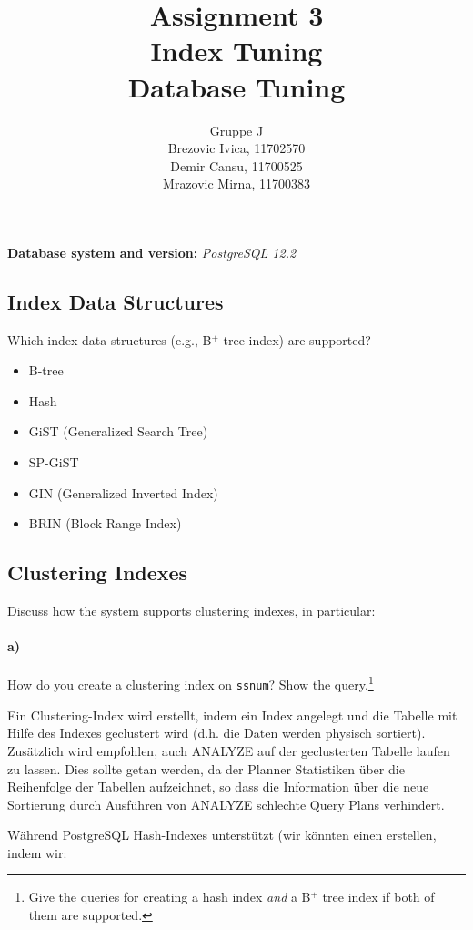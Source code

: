 \documentclass[11pt]{scrartcl}
\title{
  \textbf{\large Assignment 3} \\
  Index Tuning \\
  {\large Database Tuning}}
\author{
  Gruppe J \\
  \large Brezovic Ivica, 11702570 \\
  \large Demir Cansu, 11700525 \\
  \large Mrazovic Mirna, 11700383
}
\begin{document}
\maketitle

\textbf{Database system and version:} \emph{PostgreSQL 12.2}

\subsection{Index Data Structures}

Which index data structures (e.g., B$^+$ tree index) are supported?
 
\begin{itemize}
    \item B-tree
    \item Hash
    \item GiST (Generalized Search Tree)
    \item SP-GiST
    \item GIN (Generalized Inverted Index)
    \item BRIN (Block Range Index) 
\end{itemize}


\subsection{Clustering Indexes}

Discuss how the system supports clustering indexes, in particular:

\paragraph{a)}

How do you create a clustering index on \texttt{ssnum}? Show the query.\footnote{Give the queries for creating a hash index \emph{and} a B$^+$ tree index if both of them are supported.}

Ein Clustering-Index wird erstellt, indem ein Index angelegt und die Tabelle mit Hilfe des Indexes geclustert wird (d.h. die Daten werden physisch sortiert). Zusätzlich wird empfohlen, auch ANALYZE auf der geclusterten Tabelle laufen zu lassen. Dies sollte getan werden, da der Planner Statistiken über die Reihenfolge der Tabellen aufzeichnet, so dass die Information über die neue Sortierung durch Ausführen von ANALYZE schlechte Query Plans verhindert. 

\newpage
Während PostgreSQL Hash-Indexes unterstützt (wir könnten einen erstellen, indem wir:
\end{document}
